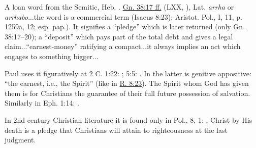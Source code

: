 \begin{compactdesc}
					\item[\textdagger\ TDNT 1:475] \phantom{.}
						\begin{compactitem}
							\item A loan word from the Semitic, Heb. . \hyperref[GENESIS-38-17]{Gn. 38:17 ff.} (LXX, ), Lat. \textit{arrha} or \textit{arrhabo}...the word is a commercial term (Isaeus 8:23); Aristot. Pol., I, 11, p. 1259a, 12; esp. pap.). It signifies a ``pledge'' which is later returned (only Gn. 38:17--20); a ``deposit'' which pays part of the total debt and gives a legal claim...``earnest-money'' ratifying a compact...it always implies an act which engages to something bigger...
							\item Paul uses it figuratively at 2 C. 1:22: ; 5:5: . In the latter  is genitive appositive: ``the earnest, i.e., the Spirit'' (like  in \hyperref[ROMANS-8-23]{R. 8:23}). The Spirit whom God has given them is for Christians the guarantee of their full future possession of salvation. Similarly in Eph. 1:14: .
							\item In 2nd century Christian literature it is found only in Pol., 8, 1: , Christ by His death is a pledge that  Christians will attain to righteousness at the last judgment.
						\end{compactitem}
						
						
						
						
				\end{compactdesc}
		
